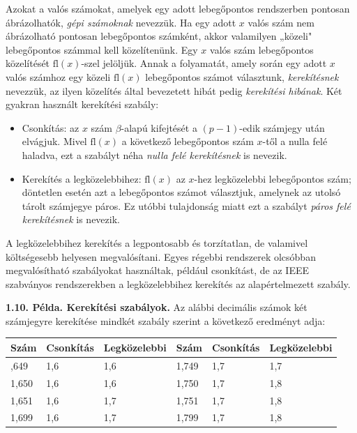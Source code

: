 \documentclass[
  magyar,
  11pt]{article}
\providecommand{\tightlist}{%
  \setlength{\itemsep}{0pt}\setlength{\parskip}{0pt}}
\begin{document}
Azokat a valós számokat, amelyek egy adott lebegőpontos rendszerben
pontosan ábrázolhatók, \emph{gépi számoknak} nevezzük. Ha egy adott
\(x\) valós szám nem ábrázolható pontosan lebegőpontos számként, akkor
valamilyen „közeli" lebegőpontos számmal kell közelítenünk. Egy \(x\)
valós szám lebegőpontos közelítését \(\mathrm{fl}(x)\)-szel jelöljük.
Annak a folyamatát, amely során egy adott \(x\) valós számhoz egy közeli
\(\mathrm{fl}(x)\) lebegőpontos számot választunk, \emph{kerekítésnek}
nevezzük, az ilyen közelítés által bevezetett hibát pedig
\emph{kerekítési hibának}. Két gyakran használt kerekítési szabály:

\begin{itemize}
\tightlist
\item
  Csonkítás: az \(x\) szám \(\beta\)-alapú kifejtését a \((p-1)\)-edik
  számjegy után elvágjuk. Mivel \(\mathrm{fl}(x)\) a következő
  lebegőpontos szám \(x\)-től a nulla felé haladva, ezt a szabályt néha
  \emph{nulla felé kerekítésnek} is nevezik.
\item
  Kerekítés a legközelebbihez: \(\mathrm{fl}(x)\) az \(x\)-hez
  legközelebbi lebegőpontos szám; döntetlen esetén azt a lebegőpontos
  számot választjuk, amelynek az utolsó tárolt számjegye páros. Ez
  utóbbi tulajdonság miatt ezt a szabályt \emph{páros felé kerekítésnek}
  is nevezik.
\end{itemize}

A legközelebbihez kerekítés a legpontosabb és torzítatlan, de valamivel
költségesebb helyesen megvalósítani. Egyes régebbi rendszerek olcsóbban
megvalósítható szabályokat használtak, például csonkítást, de az IEEE
szabványos rendszerekben a legközelebbihez kerekítés az alapértelmezett
szabály.

\textbf{1.10. Példa. Kerekítési szabályok.} Az alábbi decimális számok
két számjegyre kerekítése mindkét szabály szerint a következő eredményt
adja:

\begin{longtable}[]{@{}llllll@{}}
\toprule\noalign{}
Szám & Csonkítás & Legközelebbi & Szám & Csonkítás & Legközelebbi \\
\midrule\noalign{}
\endhead
\bottomrule\noalign{}
\endlastfoot
1,649 & 1,6 & 1,6 & 1,749 & 1,7 & 1,7 \\
1,650 & 1,6 & 1,6 & 1,750 & 1,7 & 1,8 \\
1,651 & 1,6 & 1,7 & 1,751 & 1,7 & 1,8 \\
1,699 & 1,6 & 1,7 & 1,799 & 1,7 & 1,8 \\
\end{longtable}
\end{document}
